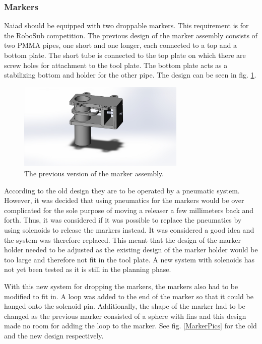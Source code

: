 \subsubsection{Markers}
	\noindent Naiad should be equipped with two droppable markers. This requirement is for the RoboSub competition. The previous design of the marker assembly consists of two PMMA pipes, one short and one longer, each connected to a top and a bottom plate. The short tube is connected to the top plate on which there are screw holes for attachment to the tool plate. The bottom plate acts as a stabilizing bottom and holder for the other pipe. The design can be seen in fig. \ref{helluuu}. 
	
	\begin{figure}[!ht]
	\begin{center}
		\includegraphics[width=80mm]{./Images/Mechanics/Markerassem3.jpg}
		\caption{The previous version of the marker assembly.}
		\label{helluuu}
	\end{center}
\end{figure}

According to the old design they are to be operated by a pneumatic system. However, it was decided that using pneumatics for the markers would be over complicated for the sole purpose of moving a releaser a few millimeters back and forth. Thus, it was considered if it was possible to replace the pneumatics by using solenoids to release the markers instead. It was considered a good idea and the system was therefore replaced. This meant that the design of the marker holder needed to be adjusted as the existing design of the marker holder would be too large and therefore not fit in the tool plate. A new system with solenoids has not yet been tested as it is still in the planning phase.  

With this new system for dropping the markers, the markers also had to be modified to fit in. A loop was added to the end of the marker so that it could be hanged onto the solenoid pin. Additionally, the shape of the marker had to be changed as the previous marker consisted of a sphere with fins and this design made no room for adding the loop to the marker. See fig. \ref{MarkerPics} for the old and the new design respectively.

